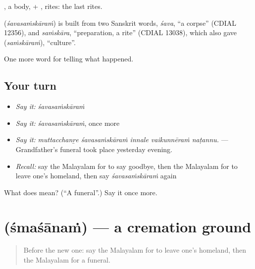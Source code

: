 , a body, + , rites: the last rites.

\begin{cousinweb}
\textbf{} (\emph{śavasaṁskāraṁ}) is built from two Sanskrit words, \emph{śava}, \textquotedblleft{}a corpse\textquotedblright{} (CDIAL 12356), and \emph{saṁskāra}, \textquotedblleft{}preparation, a rite\textquotedblright{} (CDIAL 13038), which also gave  (\emph{saṁskāraṁ}), \textquotedblleft{}culture\textquotedblright{}.
\end{cousinweb}

\begin{grammarlens}[title={What you've built}]
One more word for telling what happened.
\end{grammarlens}

\subsection*{Your turn}
\begin{itemize}
\raggedright
  \item \emph{Say it:} \emph{śavasaṁskāraṁ}
  \item \emph{Say it:} \emph{śavasaṁskāraṁ}, once more
  \item \emph{Say it:} \emph{muttacchanṟe śavasaṁskāraṁ innale vaikunnēraṁ naṭannu.} — Grandfather's funeral took place yesterday evening.
  \item \emph{Recall:} say the Malayalam for to say goodbye, then the Malayalam for to leave one's homeland, then say \emph{śavasaṁskāraṁ} again
\end{itemize}

\begin{tcolorbox}[breakable,colback=teal!4,colframe=teal!35!black,title={Before you move on}]
What does  mean? (\textquotedblleft{}A funeral\textquotedblright{}.) Say it once more.
\end{tcolorbox}
\section[\texorpdfstring{\ml{ശ്മശാനം} (śmaśānaṁ)}{ശ്മശാനം (śmaśānaṁ)}]{ (śmaśānaṁ) — a cremation ground}

\label{lesson:ML-C391-smasanam}



\begin{quote}
Before the new one: say the Malayalam for to leave one's homeland, then the Malayalam for a funeral.
\end{quote}

